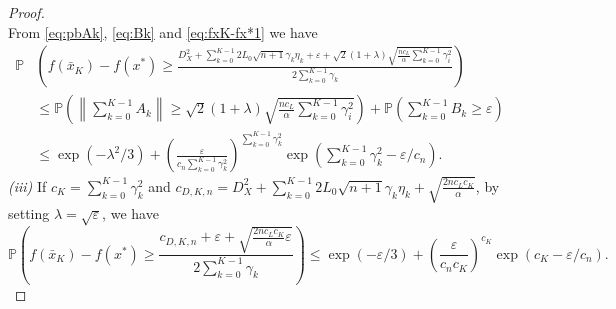 \documentclass[11pt,reqno]{amsart}
\newcommand{\1}{{\bf 1}}
\newcommand{\2}{{\bf 2}}
\newcommand{\us}[1]{\textcolor{red}{#1}}
\newcommand{\al}{\alpha}
\numberwithin{equation}{section}
\theoremstyle{remark}
\begin{document}
{\begin{proof}
\begin{equation}
		\end{equation}
		From \eqref{eq:pbAk}, \eqref{eq:Bk} and \eqref{eq:fxK-fx*1} we have
		\begin{align*}
			\mathbb{P}&\left(f(\bar{x}_K)-f(x^*)\geq \frac{D_X^2+\sum_{k=0}^{K-1}2L_0\sqrt{n+1}\gamma_k\eta_k 
				+\varepsilon+\sqrt{2}(1+\lambda) \sqrt{\frac{nc_L}{\al}\sum_{k=0}^{K-1} \gamma_i^2}}{2\sum_{k=0}^{K-1} \gamma_k}\right)\\
			&\leq \mathbb{P}\left(\left\|\sum_{k=0}^{K-1}A_k\right\| \geq \sqrt{2}(1+\lambda) \sqrt{\frac{nc_L}{\al}\sum_{k=0}^{K-1} \gamma_i^2}\right)+\mathbb{P}\left(\sum_{k=0}^{K-1}B_k \geq \varepsilon\right)\\
			&\leq \exp\left(-\lambda^2/3\right)+\left(\frac{\varepsilon}{c_n\sum_{k=0}^{K-1}\gamma_k^2}\right)^{\sum_{k=0}^{K-1}\gamma_k^2}\exp\left(\sum_{k=0}^{K-1}\gamma_k^2-\varepsilon/c_n\right).
		\end{align*}
		{\em (iii)} If $c_K = \sum_{k=0}^{K-1}\gamma_k^2$ and $c_{D,K,n} =D_X^2+\sum_{k=0}^{K-1}2L_0\sqrt{n+1}\gamma_k\eta_k+\sqrt{\frac{2nc_Lc_K}{\al}}$, by setting $\lambda=\sqrt{\varepsilon}$, we have
		\begin{equation}\label{eq:conceneps}
			\mathbb{P}\left(f(\bar{x}_K)-f(x^*)\geq \frac{c_{D,K,n}+\varepsilon+\sqrt{\frac{2nc_Lc_K}{\al}\varepsilon}}{2\sum_{k=0}^{K-1} \gamma_k}\right)\leq \exp\left(-\varepsilon/3\right)+\left(\frac{\varepsilon}{c_nc_K}\right)^{c_K}\exp\left(c_K-\varepsilon/c_n\right).
		\end{equation}

\end{proof}}
\end{document}
